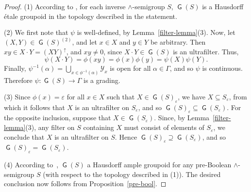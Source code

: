 \documentclass[a4paper,reqno,12pt]{amsart}
\numberwithin{equation}{section}
\theoremstyle{plain}
\theoremstyle{definition}
\newcommand{\GP}{\operatorname{\mathsf{G}}}
\begin{document}
\begin{proof}
(1) According to \cite[Proposition 2.33]{Lawson3}, for each inverse $\land$-semigroup $S$, $\GP(S)$ is a Hausdorff \'etale groupoid in the topology described in the statement. 

\smallskip

(2) We first note that $\psi$ is well-defined, by Lemma~\ref{filter-lemma}(3). Now, let $(X,Y) \in \GP(S)^{(2)}$, and let $x \in X$ and $y \in Y$ be arbitrary. Then $xy \in X \cdot Y = (XY)^{\uparrow}$, and $xy \neq 0$, since $X \cdot Y \in \GP(S)$ is an ultrafilter. Thus, 
\[\psi(X\cdot Y) = \phi(xy) = \phi(x)\phi(y) = \psi(X)\psi(Y).\]
Finally, $\psi^{-1}(\alpha) = \bigcup_{x \in \phi^{-1}(\alpha)}\mathcal{Y}_x$ is open for all $\alpha \in \Gamma$, and so $\psi$ is continuous. Therefore $\psi: \GP(S) \to \Gamma$ is a grading.

\smallskip

(3) Since $\phi(x) = \varepsilon$ for all $x \in X$ such that $X \in \GP(S)_{\varepsilon}$, we have $X \subseteq S_{\varepsilon}$, from which it follows that $X$ is an ultrafilter on $S_{\varepsilon}$, and so $\GP(S)_{\varepsilon} \subseteq \GP(S_{\varepsilon})$. For the opposite inclusion, suppose that $X \in \GP(S_{\varepsilon})$. Since, by Lemma~\ref{filter-lemma}(3), any filter on $S$ containing $X$ must consist of elements of $S_{\varepsilon}$, we conclude that $X$ is an ultrafilter on $S$. Hence $\GP(S)_{\varepsilon} \supseteq \GP(S_{\varepsilon})$, and so $\GP(S)_{\varepsilon} = \GP(S_{\varepsilon})$.

\smallskip

(4)  According to~\cite[Theorem 2.34]{Lawson3}, $\GP(S)$ a Hausdorff ample groupoid for any pre-Boolean $\land$-semigroup $S$ (with respect to the topology described in (1)). The desired conclusion now follows from Proposition~\ref{pre-bool}.
\end{proof}
\end{document}
